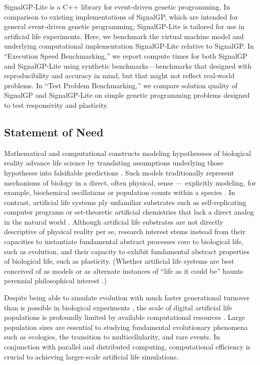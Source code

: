 SignalGP-Lite is a C++ library for event-driven genetic programming.
In comparison to existing implementations of SignalGP, which are intended for general event-driven genetic programming, SignalGP-Lite is tailored for use in artificial life experiments.
Here, we benchmark the virtual machine model and underlying computational implementation SignalGP-Lite relative to SignalGP.
In ``Execution Speed Benchmarking,'' we report compute times for both SignalGP and SignalGP-Lite using synthetic benchmarks---benchmarks that designed with reproducibility and accuracy in mind, but that might not reflect real-world problems.
In ``Test Problem Benchmarking,'' we compare solution quality of SignalGP and SignalGP-Lite on simple genetic programming problems designed to test responsivity and plasticity.

\subsection{Statement of Need}

Mathematical and computational constructs modeling hypotheseses of biological reality advance life science by translating assumptions underlying those hypotheses into falsifiable predictions \citep{gunawardena2014models}.
Such models traditionally represent mechanisms of biology in a direct, often physical, sense --- explicitly modeling, for example, biochemical oscillations or population counts within a species \citep{mogilner2006quantitative,schuster2011mathematical}.
In contrast, artificial life systems ply unfamiliar substrates such as self-replicating computer programs or set-theoretic artificial chemistries that lack a direct analog in the natural world \citep{ofria2004avida,dittrich2001artificial}.
Although artificial life substrates are not directly descriptive of physical reality per se, research interest stems instead from their capacities to instantiate fundamental abstract processes core to biological life, such as evolution, and their capacity to exhibit fundamental abstract properties of biological life, such as plasticity.
(Whether artificial life systems are best conceived of as models or as alternate instances of ``life as it could be'' haunts perennial philosophical interest \citep{shanken1998life,pennock2007models}.)

Despite being able to simulate evolution with much faster generational turnover than is possible in biological experiments \citep{ofria2004avida}, the scale of digital artificial life populations is profoundly limited by available computational resources \citep{Moreno_2020}.
Large population sizes are essential to studying fundamental evolutionary phenomena such as ecologies, the transition to multicellularity, and rare events.
In conjunction with parallel and distributed computing, computational efficiency is crucial to achieving larger-scale artificial life simulations.

